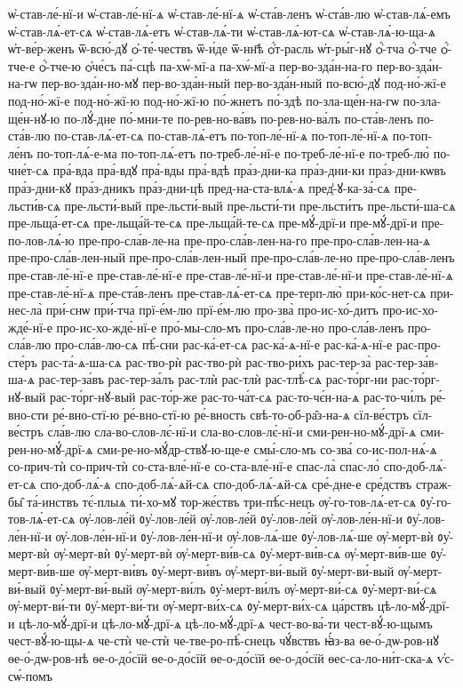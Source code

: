 {ѡ҆-став-ле́-нї-и
ѡ҆-став-ле́-нї-ѧ
ѡ҆-став-ле́-нї-ѧ
ѡ҆-ста́в-ленъ
ѡ҆-ста́в-лю
ѡ҆-став-лѧ́-емъ
ѡ҆-став-лѧ́-ет-сѧ
ѡ҆-став-лѧ́-етъ
ѡ҆-став-лѧ́-ти
ѡ҆-став-лѧ́-ют-сѧ
ѡ҆-став-лѧ́-ю-ща-ѧ
ѡ҆т-ве́р-женъ
ѿ-всю́-дꙋ
ѻ҆-те́-чествъ
ѿ-и́де
ѿ-нн҃ѣ
ѻ҆́т-расль
ѡ҆т-ры́г-нꙋ
ѻ҆́-тча
ѻ҆́-тче
ѻ҆́-тче-е
ѻ҆́-тче-ю
ѻ҆че́съ
па́-сцѣ
па-хѡ́-мї-а
па-хѡ́-мї-а
пер-во-зда́н-на-го
пер-во-зда́н-на-гѡ
пер-во-зда́н-но-мꙋ
пер-во-зда́н-ный
пер-во-зда́н-ный
по-всю́-дꙋ
под-но́-жї-е
под-но́-жї-е
под-но́-жї-ю
под-но́-жї-ю
по́-жнетъ
по́-здѣ
по-зла-ще́н-на-гѡ
по-зла-ще́н-нꙋ-ю
по-лꙋ́-дне
по́-мни-те
по-рев-но-ва́въ
по-рев-но-ва́лъ
по-ста́в-ленъ
по-ста́в-лю
по-став-лѧ́-ет-сѧ
по-став-лѧ́-етъ
по-топ-ле́-нї-ѧ
по-топ-ле́-нї-ѧ
по-топ-ле́нъ
по-топ-лѧ́-е-ма
по-топ-лѧ́-етъ
по-треб-ле́-нї-е
по-треб-ле́-нї-е
по-треб-лю̀
по-чне́т-сѧ
пра́-вда
пра́-вдꙋ
пра́-вды
пра́-вдѣ
пра́з-дни-ка
пра́з-дни-ки
пра́з-дни-кѡвъ
пра́з-дни-кꙋ
пра́з-дникъ
пра́з-дни-цѣ
пред-на-ста-влѧ́-ѧ
пред̾-ꙋ-ка-за́-сѧ
пре-льсти́в-сѧ
пре-льсти́-вый
пре-льсти́-вый
пре-льсти́-ти
пре-льсти́тъ
пре-льсти́-ша-сѧ
пре-льща́-ет-сѧ
пре-льща́й-те-сѧ
пре-льща́й-те-сѧ
пре-мꙋ́-дрї-и
пре-мꙋ́-дрї-и
пре-по-лов-лѧ́-ю
пре-про-сла́в-ле-на
пре-про-сла́в-лен-на-го
пре-про-сла́в-лен-на-ѧ
пре-про-сла́в-лен-ный
пре-про-сла́в-лен-ный
пре-про-сла́в-ле-но
пре-про-сла́в-ленъ
пре-став-ле́-нї-е
пре-став-ле́-нї-е
пре-став-ле́-нї-и
пре-став-ле́-нї-и
пре-став-ле́-нї-ѧ
пре-став-ле́-нї-ѧ
пре-ста́в-ленъ
пре-став-лѧ́-ет-сѧ
пре-терп-лю̀
при-ко́с-нет-сѧ
при-нес-ла̀
при́-снѡ
при́-тча
прї-е́м-лю
прї-е́м-лю
про-зва̀
про-ис-хо́-дитъ
про-ис-хо-жде́-нї-е
про-ис-хо-жде́-нї-е
про́-мы-сло-мъ
про-сла́в-ле-но
про-сла́в-ленъ
про-сла́в-лю
про-сла́в-лю-сѧ
пѣ́-сни
рас-ка́-ет-сѧ
рас-ка́-ѧ-нї-е
рас-ка́-ѧ-нї-е
рас-про-сте́ръ
рас-та́-ѧ-ша-сѧ
рас-тво-рѝ
рас-тво-рѝ
рас-тво-ри́хъ
рас-тер-за̀
рас-тер-за́в-ша-ѧ
рас-тер-за́въ
рас-тер-за́лъ
рас-тлѝ
рас-тлѝ
рас-тлѣ́-сѧ
рас-то́рг-ни
рас-то́рг-нꙋ-вый
рас-то́рг-нꙋ-вый
рас-то́р-же
рас-то-ча́т-сѧ
рас-то-чє́н-на-ѧ
рас-то-чи́лъ
ре́-вно-сти
ре́-вно-стї-ю
ре́-вно-стї-ю
ре́-вность
свѣ-то-ѻб-ра̑з-на-ѧ
сїл-ве́стръ
сїл-ве́стръ
сла́в-лю
сла-во-слов-лє́-нї-и
сла-во-слов-лє́-нї-и
сми-рен-но-мꙋ́-дрї-ѧ
сми-рен-но-мꙋ́-дрї-ѧ
сми-ре-но-мꙋ́др-ствꙋ-ю-ще-е
смы́-сло-мъ
со-зва́
со-ис-пол-нѧ́-ѧ
со-прич-тѝ
со-прич-тѝ
со-ста-вле́-нї-е
со-ста-вле́-нї-е
спас-ла̀
спас-ло̀
спо-доб-лѧ́-ет-сѧ
спо-доб-лѧ́-ѧ
спо-доб-лѧ́-ѧй-сѧ
спо-доб-лѧ́-ѧй-сѧ
сре́-дне-е
сре́дствъ
страж-бы̑
та́-инствъ
тє́-плыѧ
ти́-хо-мꙋ
тор-же́ствъ
три-пѣ́с-нецъ
ѹ҆-го-тов-лѧ́-ет-сѧ
ᲂу҆-го-тов-лѧ́-ет-сѧ
ѹ҆-лов-ле́й
ᲂу҆-лов-ле́й
ѹ҆-лов-ле́й
ᲂу҆-лов-ле́й
ѹ҆-лов-ле́н-нї-и
ᲂу҆-лов-ле́н-нї-и
ѹ҆-лов-ле́н-нї-и
ᲂу҆-лов-ле́н-нї-и
ѹ҆-лов-лѧ́-ше
ᲂу҆-лов-лѧ́-ше
ѹ҆-мерт-вѝ
ᲂу҆-мерт-вѝ
ѹ҆-мерт-вѝ
ᲂу҆-мерт-вѝ
ѹ҆-мерт-ви́в-сѧ
ᲂу҆-мерт-ви́в-сѧ
ѹ҆-мерт-ви́в-ше
ᲂу҆-мерт-ви́в-ше
ѹ҆-мерт-ви́въ
ᲂу҆-мерт-ви́въ
ѹ҆-мерт-ви́-вый
ᲂу҆-мерт-ви́-вый
ѹ҆-мерт-ви́-вый
ᲂу҆-мерт-ви́-вый
ѹ҆-мерт-ви́лъ
ᲂу҆-мерт-ви́лъ
ѹ҆-мерт-ви́-сѧ
ᲂу҆-мерт-ви́-сѧ
ѹ҆-мерт-ви́-ти
ᲂу҆-мерт-ви́-ти
ѹ҆-мерт-ви́х-сѧ
ᲂу҆-мерт-ви́х-сѧ
ца́рствъ
цѣ-ло-мꙋ́-дрї-и
цѣ-ло-мꙋ́-дрї-и
цѣ-ло-мꙋ́-дрї-ѧ
цѣ-ло-мꙋ́-дрї-ѧ
чест-во-ва́-ти
чест-вꙋ́-ю-щымъ
чест-вꙋ́-ю-щы-ѧ
че-стѝ
че-стѝ
че-тве-ро-пѣ́-снецъ
чꙋ́вствъ
ꙗ҆́з-ва
ѳе-о́-дѡ-ров-нꙋ
ѳе-о́-дѡ-ров-нѣ
ѳе-о-до́сїй
ѳе-о-до́сїй
ѳе-о-до́сїй
ѳе-о-до́сїй
ѳес-са-ло-ни́т-ска-ѧ
ѵ҆с-сѡ́-помъ
}

